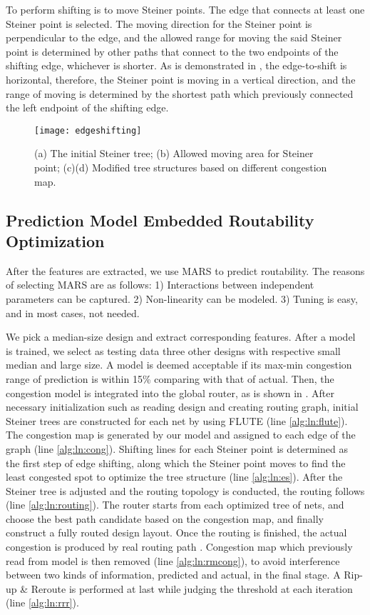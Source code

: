 To perform shifting is to move Steiner points. The edge that connects at least one Steiner point is selected. The moving direction for the Steiner point is perpendicular to the edge, and the allowed range for moving the said Steiner point is determined by other paths that connect to the two endpoints of the shifting edge, whichever is shorter. As is demonstrated in , the edge-to-shift is horizontal, therefore, the Steiner point is moving in a vertical direction, and the range of moving is determined by the shortest path which previously connected the left endpoint of the shifting edge. 
\begin{figure}[htbp]
    \centerline{\texttt{[image: edgeshifting]}}
    \caption{(a) The initial Steiner tree; (b) Allowed moving area for Steiner point; (c)(d) Modified tree structures based on different congestion map.}
    \label{fig:edgeshifting}
\end{figure}

\subsection{Prediction Model Embedded Routability Optimization}
After the features are extracted, we use MARS \cite{MARS} to predict routability. The reasons of selecting MARS are as follows: 1) Interactions between independent parameters can be captured. 2) Non-linearity can be modeled. 3) Tuning is easy, and in most cases, not needed. 

We pick a median-size design and extract corresponding features.
After a model is trained, we select as testing data three other designs with respective small median and large size.
A model is deemed acceptable if its max-min congestion range of prediction is within 15\% comparing with that of actual.
Then, the congestion model is integrated into the global router, as is shown in .
After necessary initialization such as reading design and creating routing graph, initial Steiner trees are constructed for each net by using FLUTE \cite{FLUTE} (line \ref*{alg:ln:flute}).
The congestion map is generated by our model and assigned to each edge of the graph (line \ref*{alg:ln:cong}).
Shifting lines for each Steiner point is determined as the first step of edge shifting,
along which the Steiner point moves to find the least congested spot to optimize the tree structure (line \ref*{alg:ln:es}).
After the Steiner tree is adjusted and the routing topology is conducted, the routing follows (line \ref*{alg:ln:routing}).
The router starts from each optimized tree of nets, and choose the best path candidate based on the congestion map, and finally construct a fully routed design layout.
Once the routing is finished, the actual congestion is produced by real routing path
. Congestion map which previously read from model is then removed (line \ref*{alg:ln:rmcong}), to avoid interference between two kinds of information, predicted and actual, in the final stage.
A Rip-up \& Reroute is performed at last while judging the threshold at each iteration (line \ref*{alg:ln:rrr}).


